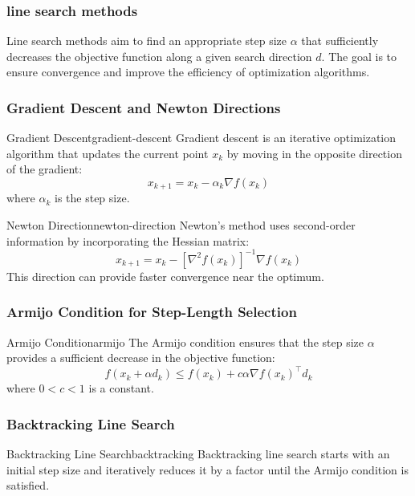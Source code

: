 \subsubsection*{line search methods}
Line search methods aim to find an appropriate step size \( \alpha \) that sufficiently decreases the objective function along a given search direction \( d \). The goal is to ensure convergence and improve the efficiency of optimization algorithms.

\subsubsection*{Gradient Descent and Newton Directions}

\begin{definition}{Gradient Descent}{gradient-descent}
	Gradient descent is an iterative optimization algorithm that updates the current point \( x_k \) by moving in the opposite direction of the gradient:
	\[
		x_{k+1} = x_k - \alpha_k \nabla f(x_k)
	\]
	where \( \alpha_k \) is the step size.
\end{definition}

\begin{definition}{Newton Direction}{newton-direction}
	Newton's method uses second-order information by incorporating the Hessian matrix:
	\[
		x_{k+1} = x_k - [\nabla^2 f(x_k)]^{-1} \nabla f(x_k)
	\]
	This direction can provide faster convergence near the optimum.
\end{definition}

\subsubsection*{Armijo Condition for Step-Length Selection}

\begin{definition}{Armijo Condition}{armijo}
	The Armijo condition ensures that the step size \( \alpha \) provides a sufficient decrease in the objective function:
	\[
		f(x_k + \alpha d_k) \leq f(x_k) + c \alpha \nabla f(x_k)^\top d_k
	\]
	where \( 0 < c < 1 \) is a constant.
\end{definition}

\subsubsection*{Backtracking Line Search}

\begin{definition}{Backtracking Line Search}{backtracking}
	Backtracking line search starts with an initial step size and iteratively reduces it by a factor until the Armijo condition is satisfied.

\end{definition}


